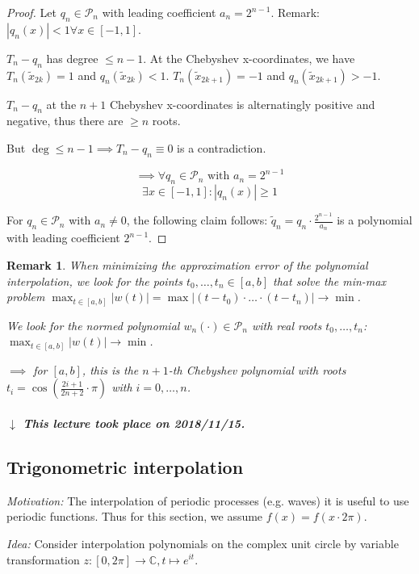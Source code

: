 \documentclass[a4paper]{article}
\newcounter{lecref}[section]
\numberwithin{lecref}{section}
\theoremstyle{break}
\newtheorem{remark}[lecref]{Remark}
\newcommand{\dateref}[1]{%
  \begin{mdframed}[backgroundcolor=gray!10,innerbottommargin=0pt,innertopmargin=0pt]
    \paragraph{\textit{$\downarrow$ This lecture took place on #1.}}%
  \end{mdframed}%
}
\newcommand{\Abs}[1]{\left|#1\right|}
\begin{document}
\begin{proof}
  Let $q_n \in \mathcal P_n$ with leading coefficient $a_n = 2^{n-1}$.
  Remark: $\Abs{q_n(x)} < 1 \forall x \in [-1, 1]$.

  $T_n - q_n$ has degree $\leq n-1$.
  At the Chebyshev x-coordinates, we have $T_n(\tilde x_{2k}) = 1$ and $q_n(\tilde x_{2k}) < 1$.
  $T_n(\tilde x_{2k+1}) = -1$ and $q_n(\tilde x_{2k+1}) > -1$.

  $T_n - q_n$ at the $n+1$ Chebyshev x-coordinates is alternatingly positive and negative,
  thus there are $\geq n$ roots.

  But $\deg \leq n-1 \implies T_n - q_n \equiv 0$ is a contradiction.

  \[ \implies \forall q_n \in \mathcal P_n \text{ with } a_n = 2^{n-1} \]
  \[ \exists x \in [-1, 1]: \Abs{q_n(x)} \geq 1 \]

  For $q_n \in \mathcal P_n$ with $a_n \neq 0$, the following claim follows:
  $\tilde q_n = q_n \cdot \frac{2^{n-1}}{a_n}$ is a polynomial with leading coefficient $2^{n-1}$.
\end{proof}

\begin{remark}
  \label{remark:4-18}
  When minimizing the approximation error of the polynomial interpolation, we look for the points $t_0, \dots, t_n \in [a,b]$ that solve the min-max problem $\max_{t \in [a,b]} \Abs{w(t)} = \max{\Abs{(t - t_0) \cdot \dots \cdot (t - t_n)}} \to \min$.

  We look for the normed polynomial $w_n(\cdot) \in \mathcal P_n$ with real roots $t_0, \dots, t_n$: $\max_{t \in [a,b]} \Abs{w(t)} \to \min$.

  $\implies$ for $[a,b]$, this is the $n+1$-th Chebyshev polynomial with roots $t_i = \cos\left(\frac{2i+1}{2n+2} \cdot \pi\right)$ with $i = 0, \dots, n$.
\end{remark}

\dateref{2018/11/15}

\subsection{Trigonometric interpolation}
\label{ch:4-2}

\emph{Motivation:} The interpolation of periodic processes (e.g. waves) it is useful to use periodic functions. Thus for this section, we assume $f(x) = f(x \cdot 2\pi)$.

\emph{Idea:} Consider interpolation polynomials on the complex unit circle by variable transformation $z: [0, 2\pi] \to \mathbb C, t \mapsto e^{it}$.
\end{document}
